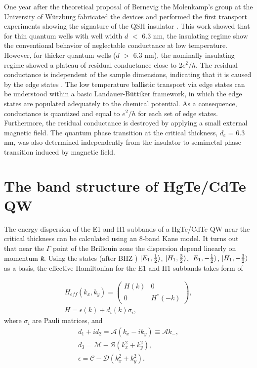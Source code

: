 \documentclass[titlepage,a4paper]{book}
\newcommand{\wciecie}{\quad\phantom{v}}
\begin{document}
One year after the theoretical proposal of Bernevig \cite{Bernevig_Topology2} the Molenkamp's group at the University of Würzburg fabricated the devices and performed the first transport experiments showing the signature of the QSH insulator \cite{Konig_Topology}. This work showed that for thin quantum wells with well width $d$ $<$ 6.3 nm, the insulating regime show the conventional behavior of neglectable conductance at low temperature. However, for thicker quantum wells ($d$ $>$ 6.3 nm), the nominally insulating regime showed a plateau of residual conductance close to $2e^2/h$. The residual conductance is independent of the sample dimensions, indicating that it is caused by the edge states \cite{Konig_Topology}. The low temperature ballistic transport via edge states can be understood within a basic Landauer-Büttiker \cite{Landauer_MCT} framework, in which the edge states are populated adequately to the chemical potential. As a consequence, conductance is quantized and equal to $e^2/h$ for each set of edge states. Furthermore, the residual conductance is destroyed by applying a small external magnetic field. The quantum phase transition at the critical thickness, $d_c$ = 6.3 nm, was also determined independently from the insulator-to-semimetal phase transition induced by magnetic field.

\clearpage
\section{The band structure of HgTe/CdTe QW}
\wciecie
The energy dispersion of the E1 and H1 subbands of a HgTe/CdTe QW near the critical thickness can be calculated using an 8-band Kane model. It turns out that near the $\Gamma$ point of the Brillouin zone the dispersion depend linearly on momentum \textbf{\textit{k}}. Using the states (after BHZ \cite{Bernevig_Topology2}) $\ket{E_1,\frac{1}{2}}$, $\ket{H_1,\frac{3}{2}}$, $\ket{E_1,-\frac{1}{2}}$, $\ket{H_1,-\frac{3}{2}}$ as a basis, the effective Hamiltonian for the E1 and H1 subbands takes form of

\begin{equation}
\label{eq:MCT_SQW_Hamiltonian}
\begin{aligned}
H_{eff}(k_x, k_y) =  \left( \begin{array}{cc}
H(k) & 0 \\
0 & H^*(-k) \end{array} \right), \\
H = \epsilon (k) + d_i (k) \sigma_i,
\end{aligned}
\end{equation}
where $\sigma_i$ are Pauli matrices, and
\begin{equation}
\label{eq:MCT_SQW_Hamiltonian2}
\begin{aligned}
d_1 + id_2 = \mathcal{A}(k_x - ik_y) \equiv \mathcal{A}k_-, \\
d_3 = \mathcal{M} - \mathcal{B}(k_x^2 + k_y^2), \\
\epsilon = \mathcal{C} - \mathcal{D}(k_x^2 + k_y^2).
\end{aligned}
\end{equation}
\end{document}
